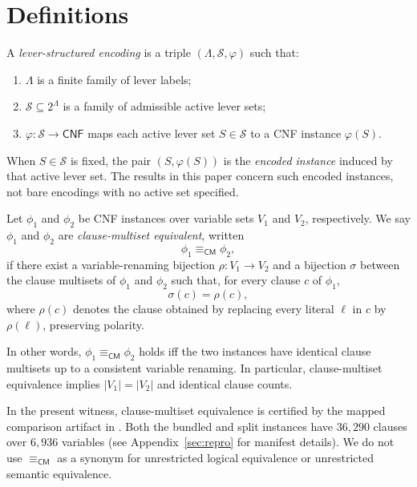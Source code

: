 \section{Definitions}
\label{sec:definitions}

\begin{definition}
\label{def:lever-encoding}
A \emph{lever-structured encoding} is a triple $(\Lambda,\mathcal{S},\varphi)$ such that:
\begin{enumerate}[label=(\roman*),leftmargin=1.8em]
\item $\Lambda$ is a finite family of lever labels;
\item $\mathcal{S} \subseteq 2^\Lambda$ is a family of admissible active lever sets;
\item $\varphi : \mathcal{S} \to \mathsf{CNF}$ maps each active lever set $S \in \mathcal{S}$ to a CNF instance $\varphi(S)$.
\end{enumerate}
When $S \in \mathcal{S}$ is fixed, the pair $(S,\varphi(S))$ is the \emph{encoded instance} induced by that active lever set.
The results in this paper concern such encoded instances, not bare encodings with no active set specified.
\end{definition}

\begin{definition}
\label{def:clause-multiset-equiv}
Let $\phi_1$ and $\phi_2$ be CNF instances over variable sets $V_1$ and $V_2$, respectively.
We say $\phi_1$ and $\phi_2$ are \emph{clause-multiset equivalent}, written
\[
  \phi_1 \equiv_{\mathsf{CM}} \phi_2,
\]
if there exist a variable-renaming bijection $\rho : V_1 \to V_2$ and a bijection $\sigma$ between the clause multisets of $\phi_1$ and $\phi_2$ such that, for every clause $c$ of $\phi_1$,
\[
  \sigma(c) = \rho(c),
\]
where $\rho(c)$ denotes the clause obtained by replacing every literal $\ell$ in $c$ by $\rho(\ell)$, preserving polarity.

In other words, $\phi_1 \equiv_{\mathsf{CM}} \phi_2$ holds iff the two instances have identical clause multisets up to a consistent variable renaming.
In particular, clause-multiset equivalence implies $|V_1| = |V_2|$ and identical clause counts.
\end{definition}

\begin{remark}
\label{rem:cm-witness}
In the present witness, clause-multiset equivalence is certified by the mapped comparison artifact in .
Both the bundled and split instances have $36{,}290$ clauses over $6{,}936$ variables (see Appendix~\ref{sec:repro} for manifest details).
We do not use $\equiv_{\mathsf{CM}}$ as a synonym for unrestricted logical equivalence or unrestricted semantic equivalence.
\end{remark}

